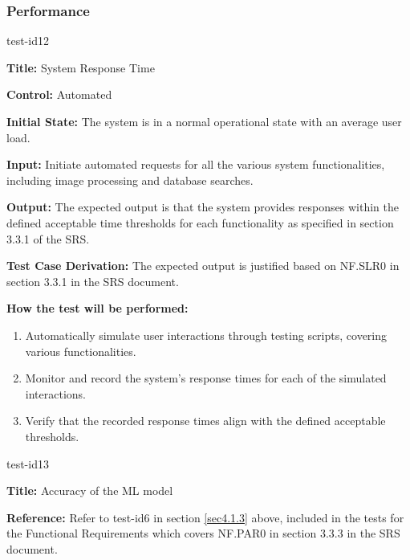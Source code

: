 \documentclass[12pt, titlepage]{article}
\begin{document}
\subsubsection{Performance}
\begin{itemize}
    \begin{item}
        test-id12
        \begin{mdframed}[linewidth=0.5mm]
            \textbf{Title:} System Response Time \par
            \textbf{Control:} Automated \par
            \textbf{Initial State:} The system is in a normal operational state with an average user load. \par
            \textbf{Input:} Initiate automated requests for all the various system functionalities, including image processing and database searches. \par
            \textbf{Output:} The expected output is that the system provides responses within the defined acceptable time thresholds for each functionality as specified in section 3.3.1 of the SRS. \par
            \textbf{Test Case Derivation:} The expected output is justified based on NF.SLR0 in section 3.3.1 in the SRS document. \par
            \textbf{How the test will be performed:}
            \begin{enumerate}[noitemsep]
                \item Automatically simulate user interactions through testing scripts, covering various functionalities.
                \item Monitor and record the system's response times for each of the simulated interactions.
                \item Verify that the recorded response times align with the defined acceptable thresholds.
            \end{enumerate}
        \end{mdframed}
    \end{item}

    \begin{item}
        test-id13
        \begin{mdframed}[linewidth=0.5mm]
            \textbf{Title:} Accuracy of the ML model \par
            \textbf{Reference:} Refer to test-id6 in section \ref{sec4.1.3} above, included in the tests for the Functional Requirements which covers NF.PAR0 in section 3.3.3 in the SRS document.
        \end{mdframed}
    \end{item}


\end{itemize}
\end{document}
